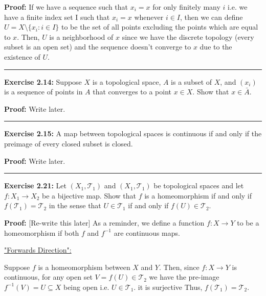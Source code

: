 \documentclass{article}
\newcommand*{\T}{\mathcal T}
\begin{document}
\vskip 0.5cm

\textbf{Proof:} If we have a sequence such that $x_i = x$ for only finitely many $i$ i.e. we have a finite index set I such that $x_i = x$ whenever $i \in I$, then we can define $U = X \setminus \{x_i : i \in I\}$  to be the set of all points excluding the points which are equal to $x$. Then, $U$ is a neighborhood of $x$ since we have the discrete topology (every subset is an open set) and the sequence doesn't converge to $x$ due to the existence of $U$.

\vskip 0.5cm
\hrule
\vskip 0.5cm

\textbf{Exercise 2.14:} Suppose $X$ is a topological space, $A$ is a subset of $X$, and $(x_i)$ is a
sequence of points in $A$ that converges to a point $x \in X$. Show that $x \in \bar{A}$.

\vskip 0.5cm

\textbf{Proof:} Write later.

\vskip 0.5cm
\hrule
\vskip 0.5cm

\textbf{Exercise 2.15:} A map between topological spaces is continuous if and only if the preimage of every closed subset is closed.

\vskip 0.5cm

\textbf{Proof:} Write later.




\vskip 0.5cm
\hrule
\vskip 0.5cm

\textbf{Exercise 2.21:} Let $(X_1, \T_1)$ and $(X_1, \T_1)$ be topological spaces and let $f : X_1 \rightarrow X_2$ be a bijective map. Show that $f$ is a homeomorphism if and only if $f(\T_1) = \T_2$ in the sense that $U \in \T_1$ if and only if $f(U) \in \T_2$.

\vskip 0.5cm

\textbf{Proof:} [Re-write this later]
As a reminder, we define a function $f : X \rightarrow Y$ to be a homeomorphism if both $f$ and $f^{-1}$ are continuous maps.

\vskip 0.5cm

\underline{"Forwards Direction":}

Suppose $f$ is a homeomorphism between $X$ and $Y$. Then, since $f : X \rightarrow Y $ is continuous, for any open set $V = f(U) \in \T_2$ we have the pre-image $f^{-1}(V) = U \subseteq X$ being open i.e. $U \in \T_1$. it is surjective  Thus, $f(\T_1) = \T_2$.
\end{document}
